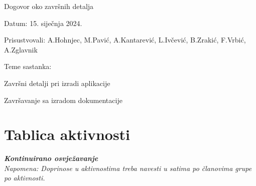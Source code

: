 \begin{packed_enum}
				\item  Dogovor oko završnih detalja
			
			\item[] \begin{packed_item}
				\item Datum: 15. siječnja 2024.
				\item Prisustvovali: A.Hohnjec, M.Pavić, A.Kantarević, L.Ivčević, B.Zrakić, F.Vrbić, A.Zglavnik
				\item Teme sastanka:
				\begin{packed_item}
					\item  Završni detalji pri izradi aplikacije
					\item  Završavanje sa izradom dokumentacije
				\end{packed_item}
			\end{packed_item}
			
		\end{packed_enum}
		
		\eject
		\section*{Tablica aktivnosti}
		
			\textbf{\textit{Kontinuirano osvježavanje}}\\
			
			 \textit{Napomena: Doprinose u aktivnostima treba navesti u satima po članovima grupe po aktivnosti.}

